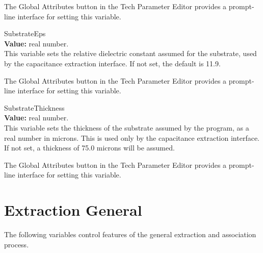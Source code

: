 \begin{description}
The {\cb Global Attributes} button in the {\cb Tech Parameter Editor}
provides a prompt-line interface for setting this variable.

\item{\et SubstrateEps}\\
{\bf Value:} real number.\\
This variable sets the relative dielectric constant assumed for the
substrate, used by the capacitance extraction interface.  If not set,
the default is 11.9.

The {\cb Global Attributes} button in the {\cb Tech Parameter Editor}
provides a prompt-line interface for setting this variable.

\item{\et SubstrateThickness}\\
{\bf Value:} real number.\\
This variable sets the thickness of the substrate assumed by the
program, as a real number in microns.  This is used only by the
capacitance extraction interface.  If not set, a thickness of 75.0
microns will be assumed.

The {\cb Global Attributes} button in the {\cb Tech Parameter Editor}
provides a prompt-line interface for setting this variable.
\end{description}


\section{Extraction General}
The following variables control features of the general extraction and
association process.

